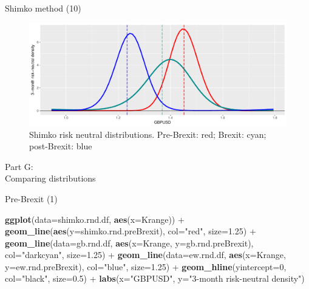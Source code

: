 \documentclass[ignorenonframetext,aspectratio=169]{beamer}
\newenvironment{Shaded}{}{}
\newcommand{\KeywordTok}[1]{\textcolor[rgb]{0.00,0.44,0.13}{\textbf{#1}}}
\newcommand{\DataTypeTok}[1]{\textcolor[rgb]{0.56,0.13,0.00}{#1}}
\newcommand{\DecValTok}[1]{\textcolor[rgb]{0.25,0.63,0.44}{#1}}
\newcommand{\FloatTok}[1]{\textcolor[rgb]{0.25,0.63,0.44}{#1}}
\newcommand{\StringTok}[1]{\textcolor[rgb]{0.25,0.44,0.63}{#1}}
\newcommand{\OperatorTok}[1]{\textcolor[rgb]{0.40,0.40,0.40}{#1}}
\newcommand{\NormalTok}[1]{#1}
\begin{document}
\begin{frame}{Shimko method (10)}

\begin{figure}
\includegraphics[width=1\linewidth]{2018_02_07_IMF_FXCourse_files/figure-beamer/unnamed-chunk-76-1} \caption{Shimko risk neutral distributions. Pre-Brexit: red; Brexit: cyan; post-Brexit: blue}\label{fig:unnamed-chunk-76}
\end{figure}

\end{frame}

\begin{frame}{}

\color{blue} \LARGE{Part G:}\\
\LARGE{Comparing distributions}

\end{frame}

\begin{frame}[fragile]{Pre-Brexit (1)}

\begin{Shaded}
\begin{Highlighting}[]
\KeywordTok{ggplot}\NormalTok{(}\DataTypeTok{data=}\NormalTok{shimko.rnd.df, }\KeywordTok{aes}\NormalTok{(}\DataTypeTok{x=}\NormalTok{Krange)) }\OperatorTok{+}\StringTok{ }
\StringTok{  }\KeywordTok{geom_line}\NormalTok{(}\KeywordTok{aes}\NormalTok{(}\DataTypeTok{y=}\NormalTok{shimko.rnd.preBrexit), }\DataTypeTok{col=}\StringTok{"red"}\NormalTok{, }\DataTypeTok{size=}\FloatTok{1.25}\NormalTok{) }\OperatorTok{+}
\StringTok{  }\KeywordTok{geom_line}\NormalTok{(}\DataTypeTok{data=}\NormalTok{gb.rnd.df, }\KeywordTok{aes}\NormalTok{(}\DataTypeTok{x=}\NormalTok{Krange, }\DataTypeTok{y=}\NormalTok{gb.rnd.preBrexit), }
            \DataTypeTok{col=}\StringTok{"darkcyan"}\NormalTok{, }\DataTypeTok{size=}\FloatTok{1.25}\NormalTok{) }\OperatorTok{+}
\StringTok{  }\KeywordTok{geom_line}\NormalTok{(}\DataTypeTok{data=}\NormalTok{ew.rnd.df, }\KeywordTok{aes}\NormalTok{(}\DataTypeTok{x=}\NormalTok{Krange, }\DataTypeTok{y=}\NormalTok{ew.rnd.preBrexit), }
            \DataTypeTok{col=}\StringTok{"blue"}\NormalTok{, }\DataTypeTok{size=}\FloatTok{1.25}\NormalTok{) }\OperatorTok{+}
\StringTok{  }\KeywordTok{geom_hline}\NormalTok{(}\DataTypeTok{yintercept=}\DecValTok{0}\NormalTok{, }\DataTypeTok{col=}\StringTok{"black"}\NormalTok{, }\DataTypeTok{size=}\FloatTok{0.5}\NormalTok{) }\OperatorTok{+}
\StringTok{  }\KeywordTok{labs}\NormalTok{(}\DataTypeTok{x=}\StringTok{"GBPUSD"}\NormalTok{, }\DataTypeTok{y=}\StringTok{"3-month risk-neutral density"}\NormalTok{)   }
\end{Highlighting}
\end{Shaded}

\end{frame}
\end{document}
